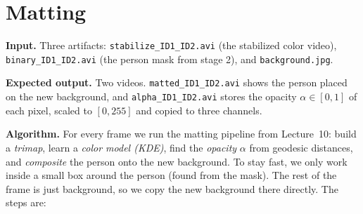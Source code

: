 \documentclass[11pt]{article}
\begin{document}
\section{Matting}

\noindent
\textbf{Input.} Three artifacts: \texttt{stabilize\_ID1\_ID2.avi} (the stabilized color video),
\texttt{binary\_ID1\_ID2.avi} (the person mask from stage 2), and \texttt{background.jpg}.

\medskip
\noindent
\textbf{Expected output.} Two videos. \texttt{matted\_ID1\_ID2.avi} shows the person placed on the
new background, and \texttt{alpha\_ID1\_ID2.avi} stores the opacity $\alpha\in[0,1]$ of each pixel,
scaled to $[0,255]$ and copied to three channels.

\medskip
\noindent
\textbf{Algorithm.} For every frame we run the matting pipeline from Lecture~10: build a
\emph{trimap}, learn a \emph{color model (KDE)}, find the \emph{opacity} $\alpha$ from geodesic
distances, and \emph{composite} the person onto the new background. To stay fast, we only work inside
a small box around the person (found from the mask). The rest of the frame is just background, so we
copy the new background there directly. The steps are:
\end{document}

